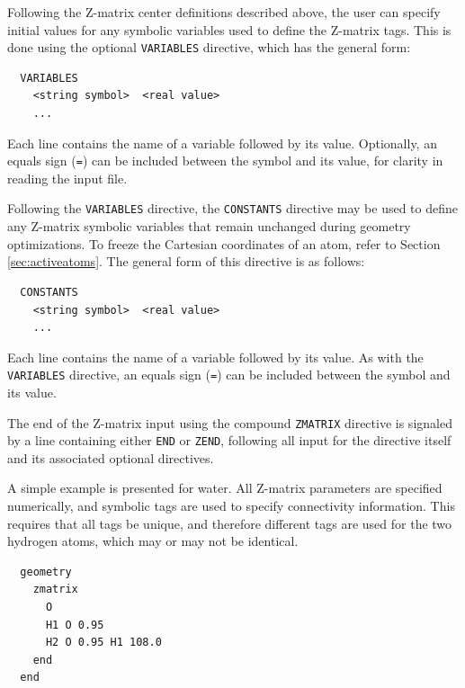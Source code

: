Following the Z-matrix center definitions described above, the user can
 specify initial values for any symbolic variables used to define the
Z-matrix tags.  This is done using the optional  \verb+VARIABLES+ directive,
which has the general form:

\begin{verbatim}
  VARIABLES
    <string symbol>  <real value>
    ...
\end{verbatim}
Each line contains the name of a variable followed by its value.
Optionally, an equals sign (\verb+=+) can be included between the
symbol and its value, for clarity in reading the input file.


Following the \verb+VARIABLES+ directive, the \verb+CONSTANTS+
directive may be used to define any Z-matrix symbolic variables that remain
unchanged during geometry optimizations. 
To freeze the Cartesian coordinates of an atom, refer
to Section \ref{sec:activeatoms}.  The general form of this directive
is as follows:
\begin{verbatim}
  CONSTANTS
    <string symbol>  <real value>
    ...
\end{verbatim}
Each line contains the name of a variable followed by its value.  As
with the \verb+VARIABLES+ directive, an equals sign (\verb+=+) can be
included between the symbol and its value.

The end of the Z-matrix input using the compound \verb+ZMATRIX+
directive is signaled by a line containing either \verb+END+ or
\verb+ZEND+, following all input for the directive itself and its
associated optional directives.  

A simple example is presented for water.  All Z-matrix parameters are
specified numerically, and symbolic tags are used to specify
connectivity information.  This requires that all tags be unique, and
therefore different tags are used for the two hydrogen atoms, which may 
or may not be identical.  
\begin{verbatim}
  geometry
    zmatrix 
      O
      H1 O 0.95
      H2 O 0.95 H1 108.0
    end
  end
\end{verbatim}

